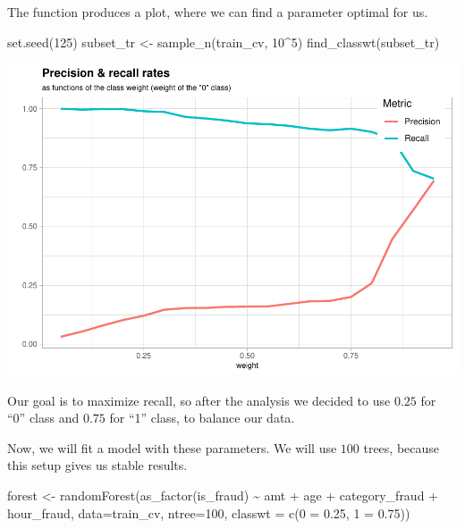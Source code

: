 \documentclass[
]{report}
\newenvironment{Shaded}{\begin{snugshade}}{\end{snugshade}}
\newcommand{\AttributeTok}[1]{\textcolor[rgb]{0.77,0.63,0.00}{#1}}
\newcommand{\DecValTok}[1]{\textcolor[rgb]{0.00,0.00,0.81}{#1}}
\newcommand{\FloatTok}[1]{\textcolor[rgb]{0.00,0.00,0.81}{#1}}
\newcommand{\FunctionTok}[1]{\textcolor[rgb]{0.00,0.00,0.00}{#1}}
\newcommand{\NormalTok}[1]{#1}
\newcommand{\OtherTok}[1]{\textcolor[rgb]{0.56,0.35,0.01}{#1}}
\newcommand{\SpecialCharTok}[1]{\textcolor[rgb]{0.00,0.00,0.00}{#1}}
\newcommand{\StringTok}[1]{\textcolor[rgb]{0.31,0.60,0.02}{#1}}
\begin{document}
The function produces a plot, where we can find a parameter optimal for
us.

\begin{Shaded}
\begin{Highlighting}[]
\FunctionTok{set.seed}\NormalTok{(}\DecValTok{125}\NormalTok{)}
\NormalTok{subset\_tr }\OtherTok{\textless{}{-}} \FunctionTok{sample\_n}\NormalTok{(train\_cv, }\DecValTok{10}\SpecialCharTok{\^{}}\DecValTok{5}\NormalTok{)}
\FunctionTok{find\_classwt}\NormalTok{(subset\_tr)}
\end{Highlighting}
\end{Shaded}

\includegraphics{credit_card_fraud_detection_files/figure-latex/finding_classwt1-1.pdf}

Our goal is to maximize recall, so after the analysis we decided to use
\(0.25\) for ``0'' class and \(0.75\) for ``1'' class, to balance our
data.

Now, we will fit a model with these parameters. We will use \(100\)
trees, because this setup gives us stable results.

\begin{Shaded}
\begin{Highlighting}[]
\NormalTok{forest }\OtherTok{\textless{}{-}} \FunctionTok{randomForest}\NormalTok{(}\FunctionTok{as\_factor}\NormalTok{(is\_fraud) }\SpecialCharTok{\textasciitilde{}}\NormalTok{ amt }\SpecialCharTok{+}\NormalTok{ age }\SpecialCharTok{+}\NormalTok{ category\_fraud }\SpecialCharTok{+}\NormalTok{ hour\_fraud,}
                       \AttributeTok{data=}\NormalTok{train\_cv, }
                       \AttributeTok{ntree=}\DecValTok{100}\NormalTok{, }
                       \AttributeTok{classwt =} \FunctionTok{c}\NormalTok{(}\StringTok{\textquotesingle{}0\textquotesingle{}} \OtherTok{=} \FloatTok{0.25}\NormalTok{, }\StringTok{\textquotesingle{}1\textquotesingle{}} \OtherTok{=} \FloatTok{0.75}\NormalTok{))}
\end{Highlighting}
\end{Shaded}
\end{document}
